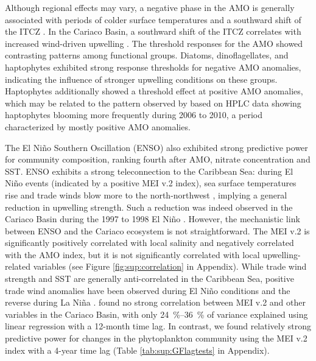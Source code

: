 \documentclass[]{agujournal2019}
\begin{document}
    Although regional effects may vary, a negative phase in the AMO is generally associated with periods of colder surface temperatures and a southward shift of the ITCZ \cite{knight_climate_2006, colna_latitudinal_2017}. In the Cariaco Basin, a southward shift of the ITCZ correlates with increased wind-driven upwelling \cite{taylor_ecosystem_2012}. The threshold responses for the AMO showed contrasting patterns among functional groups. Diatoms, dinoflagellates, and haptophytes exhibited strong response thresholds for negative AMO anomalies, indicating the influence of stronger upwelling conditions on these groups. Haptophytes additionally showed a threshold effect at positive AMO anomalies, which may be related to the pattern observed by  based on HPLC data showing haptophytes blooming more frequently during 2006 to 2010, a period characterized by mostly positive AMO anomalies.

    The El Niño Southern Oscillation (ENSO) also exhibited strong predictive power for community composition, ranking fourth after AMO, nitrate concentration and SST. ENSO exhibits a strong teleconnection to the Caribbean Sea: during El Niño events (indicated by a positive MEI v.2 index), sea surface temperatures rise and trade winds blow more to the north-northwest \cite{enfield_tropical_1997}, implying a general reduction in upwelling strength. Such a reduction was indeed observed in the Cariaco Basin during the 1997 to 1998 El Niño \cite{romero_seasonal_2009}. However, the mechanistic link between ENSO and the Cariaco ecosystem is not straightforward. The MEI v.2 is significantly positively correlated with local salinity and negatively correlated with the AMO index, but it is not significantly correlated with local upwelling-related variables (see Figure \ref{fig:sup:correlation} in Appendix). While trade wind strength and SST are generally anti-correlated in the Caribbean Sea, positive trade wind anomalies have been observed during El Niño conditions and the reverse during La Niña \cite{chang_coupled_2013}.  found no strong correlation between MEI v.2 and other variables in the Cariaco Basin, with only \qtyrange{24}{36}{\percent} of variance explained using linear regression with a 12-month time lag. In contrast, we found relatively strong predictive power for changes in the phytoplankton community using the MEI v.2 index with a 4-year time lag (Table \ref{tab:sup:GFlagtests} in Appendix).
    
\end{document}
